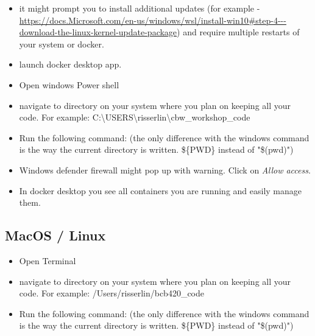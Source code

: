 \documentclass[
]{book}
\newenvironment{Shaded}{\begin{snugshade}}{\end{snugshade}}
\newcommand{\DecValTok}[1]{\textcolor[rgb]{0.00,0.00,0.81}{#1}}
\newcommand{\ErrorTok}[1]{\textcolor[rgb]{0.64,0.00,0.00}{\textbf{#1}}}
\newcommand{\NormalTok}[1]{#1}
\newcommand{\OtherTok}[1]{\textcolor[rgb]{0.56,0.35,0.01}{#1}}
\newcommand{\SpecialCharTok}[1]{\textcolor[rgb]{0.00,0.00,0.00}{#1}}
\providecommand{\tightlist}{%
  \setlength{\itemsep}{0pt}\setlength{\parskip}{0pt}}
\begin{document}
\begin{itemize}
\tightlist
\item
  it might prompt you to install additional updates (for example - \url{https://docs.Microsoft.com/en-us/windows/wsl/install-win10\#step-4---download-the-linux-kernel-update-package}) and require multiple restarts of your system or docker.
\item
  launch docker desktop app.
\item
  Open windows Power shell
\item
  navigate to directory on your system where you plan on keeping all your code. For example: C:\textbackslash USERS\textbackslash risserlin\textbackslash cbw\_workshop\_code
\item
  Run the following command: (the only difference with the windows command is the way the current directory is written. \$\{PWD\} instead of "\$(pwd)")
\end{itemize}

\begin{Shaded}
\end{Shaded}

\begin{itemize}
\tightlist
\item
  Windows defender firewall might pop up with warning. Click on \emph{Allow access}.
\item
  In docker desktop you see all containers you are running and easily manage them.
\end{itemize}

\hypertarget{macos-linux}{%
\subsection{MacOS / Linux}\label{macos-linux}}

\begin{itemize}
\tightlist
\item
  Open Terminal
\item
  navigate to directory on your system where you plan on keeping all your code. For example: /Users/risserlin/bcb420\_code
\item
  Run the following command: (the only difference with the windows command is the way the current directory is written. \$\{PWD\} instead of "\$(pwd)")
\end{itemize}
\end{document}
